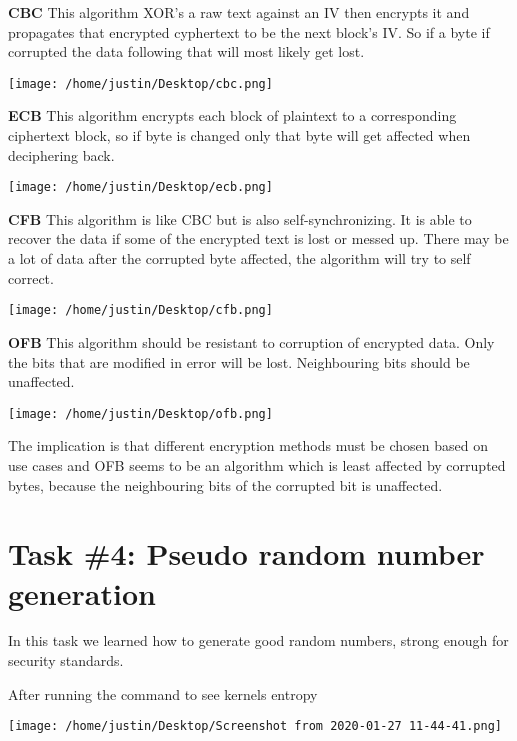 \documentclass[11pt,letterpaper]{article}
\begin{document}
\textbf{CBC} This algorithm XOR’s a raw text against an IV then encrypts it and propagates that encrypted
cyphertext to be the next block’s IV. So if a byte if corrupted the data following that will most
likely get lost.
\begin{center}
\texttt{[image: /home/justin/Desktop/cbc.png]}
\end{center}

\textbf{ECB} This algorithm encrypts each block of plaintext to a corresponding ciphertext block, so if
byte is changed only that byte will get affected when deciphering back.
\begin{center}
\texttt{[image: /home/justin/Desktop/ecb.png]}
\end{center}

\textbf{CFB} This algorithm is like CBC but is also self-synchronizing. It is able to recover the data if
some of the encrypted text is lost or messed up. There may be a lot of data after the corrupted byte
affected, the algorithm will try to self correct.
\begin{center}
\texttt{[image: /home/justin/Desktop/cfb.png]}
\end{center}

\textbf{OFB} This algorithm should be resistant to corruption of encrypted data. Only the bits that
are modified in error will be lost. Neighbouring bits should be unaffected.
\begin{center}
\texttt{[image: /home/justin/Desktop/ofb.png]}
\end{center}

The implication is that different encryption methods must be chosen based on use cases and OFB seems
to be an algorithm which is least affected by corrupted bytes, because the neighbouring bits of the
corrupted bit is unaffected.
\section*{Task \#4: Pseudo random number generation}
\label{sec:orgc24cf46}

In this task we learned how to generate good random numbers, strong enough for security standards.

After running the command to see kernels entropy
\begin{center}
\texttt{[image: /home/justin/Desktop/Screenshot from 2020-01-27 11-44-41.png]}
\end{center}
\end{document}
